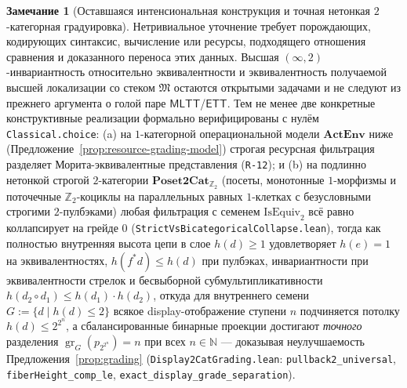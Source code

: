 \documentclass[11pt]{article}
\theoremstyle{plain}
\theoremstyle{definition}
\newtheorem{remark}[theorem]{Замечание}
\newcommand{\fM}{\mathfrak{M}}
\newcommand{\MLTT}{\mathsf{MLTT}}
\newcommand{\ETT}{\mathsf{ETT}}
\newcommand{\gr}{\operatorname{gr}}
\begin{document}
\begin{remark}[Оставшаяся интенсиональная конструкция и точная нетонкая $2$-категорная градуировка]\label{rem:grading-open}
Нетривиальное уточнение требует порождающих, кодирующих синтаксис, вычисление или ресурсы, подходящего отношения сравнения и доказанного переноса этих данных. Высшая $(\infty, 2)$-инвариантность относительно эквивалентности и эквивалентность получаемой высшей локализации со стеком $\fM$ остаются открытыми задачами и не следуют из прежнего аргумента о голой паре $\MLTT$/$\ETT$. Тем не менее две конкретные конструктивные реализации формально верифицированы с нулём \texttt{Classical.choice}: (a) на $1$-категорной операциональной модели $\mathbf{ActEnv}$ ниже (Предложение~\ref{prop:resource-grading-model}) строгая ресурсная фильтрация разделяет Морита-эквивалентные представления (\texttt{R-12}); и (b) на подлинно нетонкой строгой $2$-категории $\mathbf{Poset2Cat}_{\mathbb{Z}_2}$ (посеты, монотонные $1$-морфизмы и поточечные $\mathbb{Z}_2$-коциклы на параллельных равных $1$-клетках с безусловными строгими $2$-пулбэками) любая фильтрация с семенем $\mathrm{IsEquiv}_2$ всё равно коллапсирует на грейде $0$ (\texttt{StrictVsBicategoricalCollapse.lean}), тогда как полностью внутренняя высота цепи в слое $h(d) \ge 1$ удовлетворяет $h(e) = 1$ на эквивалентностях, $h(f^* d) \le h(d)$ при пулбэках, инвариантности при эквивалентности стрелок и бесвыборной субмультипликативности $h(d_2 \circ d_1) \le h(d_1)\cdot h(d_2)$, откуда для внутреннего семени $G := \{d \mid h(d) \le 2\}$ всякое display-отображение ступени $n$ подчиняется потолку $h(d) \le 2^{2^n}$, а сбалансированные бинарные проекции достигают \emph{точного} разделения $\gr_G(p_{2^{2^n}}) = n$ при всех $n \in \mathbb{N}$ --- доказывая неулучшаемость Предложения~\ref{prop:grading} (\texttt{Display2CatGrading.lean}: \texttt{pullback2\_\allowbreak universal}, \texttt{fiberHeight\_\allowbreak comp\_\allowbreak le}, \texttt{exact\_\allowbreak display\_\allowbreak grade\_\allowbreak separation}).
\end{remark}
\end{document}
